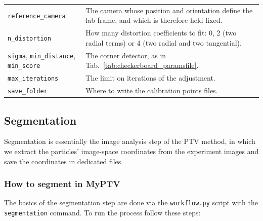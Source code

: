 \documentclass[10pt,a4paper]{article}
\begin{document}
\begin{table}
\begin{tabular}{l m{10cm}}
		\texttt{reference\_camera} & The camera whose position and orientation define the lab frame, and which is therefore held fixed. \\[.2cm]

		\texttt{n\_distortion} & How many distortion coefficients to fit: 0, 2 (two radial terms) or 4 (two radial and two tangential). \\[.2cm]

		\texttt{sigma}, \texttt{min\_distance}, \texttt{min\_score} & The corner detector, as in Tab.~\ref{tab:checkerboard_paramsfile}. \\[.2cm]

		\texttt{max\_iterations} & The limit on iterations of the adjustment. \\[.2cm]

		\texttt{save\_folder} & Where to write the calibration points files. \\[.2cm]

		\hline
	\end{tabular}
\end{table}




\subsection{Segmentation}\label{sec:workflow_segment}


Segmentation is essentially the image analysis step of the PTV method, in which we extract the particles' image-space coordinates from the experiment images and save the coordinates in dedicated files. 


\subsubsection{How to segment in MyPTV}

The basics of the segmentation step are done via the \texttt{workflow.py} script with the \texttt{segmentation} command. To run the process follow these steps:
\end{document}

